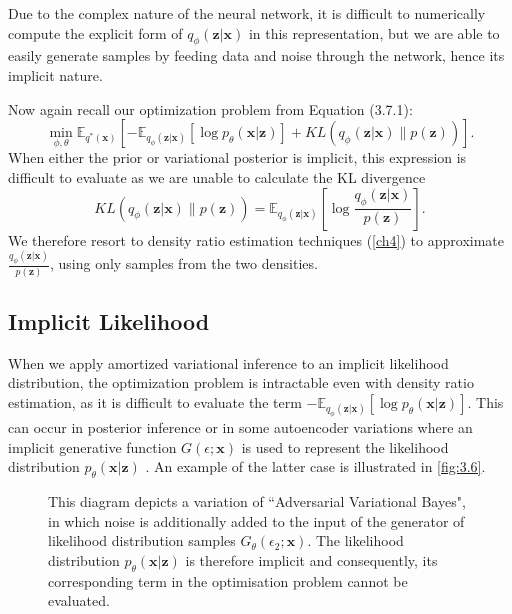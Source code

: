 \documentclass[honours,12pt]{unswthesis}
\newcommand{\E}{\mathbb{E}}
\numberwithin{equation}{section}
\theoremstyle{definition}
\begin{document}
Due to the complex nature of the neural network, it is difficult to numerically compute the explicit form of $q_\phi(\bm{z}|\bm{x})$ in this representation, but we are able to easily generate samples by feeding data and noise through the network, hence its implicit nature.

Now again recall our optimization problem from Equation (3.7.1):
\[\min_{\phi,\theta} \mathbb{E}_{q^*(\bm{x})}\left[-\E_{q_\phi(\bm{z}|\bm{x})}[\log p_\theta(\bm{x}|\bm{z})]+KL(q_\phi(\bm{z}|\bm{x})\|p(\bm{z}))\right].\]
When either the prior or variational posterior is implicit, this expression is difficult to evaluate as we are unable to calculate the KL divergence 
\[KL(q_\phi(\bm{z}|\bm{x})\|p(\bm{z}))=\E_{q_\phi(\bm{z}|\bm{x})}\left[\log \frac{q_\phi(\bm{z}|\bm{x})}{p(\bm{z})}\right].\]
We therefore resort to density ratio estimation techniques (\autoref{ch4}) to approximate $\frac{q_\phi(\bm{z}|\bm{x})}{p(\bm{z})}$, using only samples from the two densities.
\subsection{Implicit Likelihood}\label{sec:3.8.2}
When we apply amortized variational inference to an implicit likelihood distribution, the optimization problem is intractable even with density ratio estimation, as it is difficult to evaluate the term $-\E_{q_\phi(\bm{z}|\bm{x})}[\log p_\theta(\bm{x}|\bm{z})]$. This can occur in posterior inference or in some autoencoder variations where an implicit generative function $G(\epsilon;\bm{x})$ is used to represent the likelihood distribution $p_\theta(\bm{x}|\bm{z})$ \citep{ali}. An example of the latter case is illustrated in \autoref{fig:3.6}.
\begin{figure}[h]
  \centering
   \caption{\small This diagram depicts a variation of ``Adversarial Variational Bayes", in which noise is additionally added to the input of the generator of likelihood distribution samples $G_\theta(\epsilon_2;\bm{x})$. The likelihood distribution $p_\theta(\bm{x}|\bm{z})$ is therefore implicit and consequently, its corresponding term in the optimisation problem cannot be evaluated.}
   \label{fig:3.6}
\end{figure}
\end{document}
